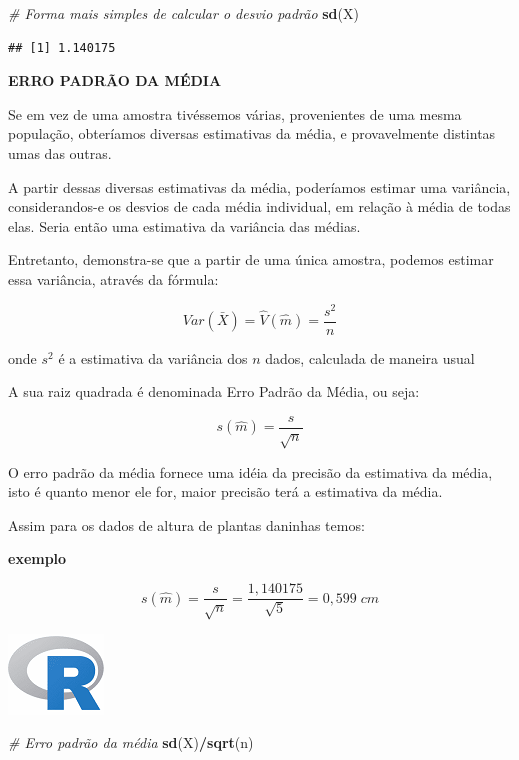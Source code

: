 \documentclass[
]{book}
\newenvironment{Shaded}{\begin{snugshade}}{\end{snugshade}}
\newcommand{\CommentTok}[1]{\textcolor[rgb]{0.56,0.35,0.01}{\textit{#1}}}
\newcommand{\KeywordTok}[1]{\textcolor[rgb]{0.13,0.29,0.53}{\textbf{#1}}}
\newcommand{\NormalTok}[1]{#1}
\newcommand{\OperatorTok}[1]{\textcolor[rgb]{0.81,0.36,0.00}{\textbf{#1}}}
\begin{document}
\begin{Shaded}
\begin{Highlighting}[]
\CommentTok{# Forma mais simples de calcular o desvio padrão}
\KeywordTok{sd}\NormalTok{(X)}
\end{Highlighting}
\end{Shaded}

\begin{verbatim}
## [1] 1.140175
\end{verbatim}

\textbf{ERRO PADRÃO DA MÉDIA}

Se em vez de uma amostra tivéssemos várias, provenientes de uma mesma população, obteríamos diversas estimativas da média, e provavelmente distintas umas das outras.

A partir dessas diversas estimativas da média, poderíamos estimar uma variância, considerandos-e os desvios de cada média individual, em relação à média de todas elas. Seria então uma estimativa da variância das médias.

Entretanto, demonstra-se que a partir de uma única amostra, podemos estimar essa variância, através da fórmula:

\[
Var(\bar{X}) = \hat{V}(\hat{m}) = \frac{s^2}{n}
\]

onde \(s^2\) é a estimativa da variância dos \(n\) dados, calculada de maneira usual

A sua raiz quadrada é denominada Erro Padrão da Média, ou seja:

\[
s(\hat{m}) = \frac{s}{\sqrt{n}}
\]

O erro padrão da média fornece uma idéia da precisão da estimativa da média, isto é quanto menor ele for, maior precisão terá a estimativa da média.

Assim para os dados de altura de plantas daninhas temos:

\textbf{exemplo}

\[
s(\hat{m}) = \frac{s}{\sqrt{n}} = \frac{1,140175}{\sqrt{5}} = 0,599\;cm
\]

\includegraphics{R.png}

\begin{Shaded}
\begin{Highlighting}[]
\CommentTok{# Erro padrão da média}
\KeywordTok{sd}\NormalTok{(X)}\OperatorTok{/}\KeywordTok{sqrt}\NormalTok{(n)}
\end{Highlighting}
\end{Shaded}
\end{document}
